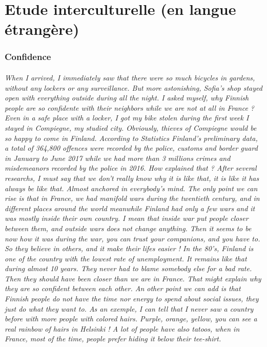 \documentclass[a4paper,12pt]{report} %
\begin{document}
\newpage
\part{Etude interculturelle (en langue étrangère)}%
\label{pt:3}

\section{Confidence}
\paragraph{When I arrived, I immediately saw that there were so much bicycles in gardens, without any lockers or any surveillance. But more astonishing, Sofia's shop stayed open with everything outside during all the night. I asked myself, why Finnish people are so confidente with their neighbors while we are not at all in France ? Even in a safe place with a locker, I got my bike stolen during the first week I stayed in Compiegne, my studied city. Obviously, thieves of Compiegne would be so happy to come in Finland. According to Statistics Finland's preliminary data, a total of 364,800 offences were recorded by the police, customs and border guard in January to June 2017 while we had more than 3 millions crimes and misdemeanors recorded by the police in 2016. How explained that ? After several researchs, I must say that we don't really know why it is like that, it is like it has always be like that. Almost anchored in everybody's mind. The only point we can rise is that in France, we had manifold wars during the twentieth century, and in different places around the world meanwhile Finland had only a few wars and it was mostly inside their own country. I mean that inside war put people closer between them, and outside wars does not change anything. Then it seems to be now how it was during the war, you can trust your companions, and you have to. So they believe in others, and it make their lifes easier ! 
In the 80's, Finland is one of the country with the lowest rate of unemployment. It remains like that during almost 10 years. They never had to blame somebody else for a bad rate. Then they should have been closer than we are in France. That might explain why they are so confident between each other.
An other point we can add is that Finnish people do not have the time nor energy to spend about social issues, they just do what they want to. As an exemple, I can tell that I never saw a country before with more people with colored hairs. Purple, orange, yellow, you can see a real rainbow of hairs in Helsinki ! A lot of people have also tatoos, when in France, most of the time, people prefer hiding it below their tee-shirt. \newline
}
\end{document}
